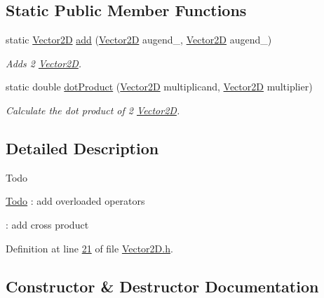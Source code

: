 \subsection*{Static Public Member Functions}
\begin{DoxyCompactItemize}
\item 
static \hyperlink{class_j118_1_1_math_1_1_vector2_d}{Vector2\+D} \hyperlink{class_j118_1_1_math_1_1_vector2_d_a6b13e1c9fc5c758c1e18a6b74d1182b2}{add} (\hyperlink{class_j118_1_1_math_1_1_vector2_d}{Vector2\+D} augend\+\_, \hyperlink{class_j118_1_1_math_1_1_vector2_d}{Vector2\+D} augend\+\_)
\begin{DoxyCompactList}\small\item\em Adds 2 \hyperlink{class_j118_1_1_math_1_1_vector2_d}{Vector2\+D}. \end{DoxyCompactList}\item 
static double \hyperlink{class_j118_1_1_math_1_1_vector2_d_a6523e255345a0aec99581b1cc92a5f09}{dot\+Product} (\hyperlink{class_j118_1_1_math_1_1_vector2_d}{Vector2\+D} multiplicand, \hyperlink{class_j118_1_1_math_1_1_vector2_d}{Vector2\+D} multiplier)
\begin{DoxyCompactList}\small\item\em Calculate the dot product of 2 \hyperlink{class_j118_1_1_math_1_1_vector2_d}{Vector2\+D}. \end{DoxyCompactList}\end{DoxyCompactItemize}


\subsection{Detailed Description}
\begin{DoxyRefDesc}{Todo}
\item[\hyperlink{todo__todo000002}{Todo}]\+: add overloaded operators 

\+: add cross product \end{DoxyRefDesc}


Definition at line \hyperlink{_vector2_d_8h_source_l00021}{21} of file \hyperlink{_vector2_d_8h_source}{Vector2\+D.\+h}.



\subsection{Constructor \& Destructor Documentation}
\hypertarget{class_j118_1_1_math_1_1_vector2_d_afb5cccf703cc5fb06c48a7a947acb5f3}{}
